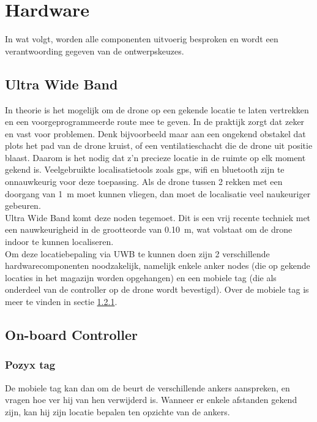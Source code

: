 \chapter{Hardware}
In wat volgt, worden alle componenten uitvoerig besproken en wordt een verantwoording gegeven van de ontwerpskeuzes.

\section{Ultra Wide Band}  \label{sec:uwb}
In theorie is het mogelijk om de drone op een gekende locatie te laten vertrekken en een voorgeprogrammeerde route mee te geven. In de praktijk zorgt dat zeker en vast voor problemen. Denk bijvoorbeeld maar aan een ongekend obstakel dat plots het pad van de drone kruist, of een ventilatieschacht die de drone uit positie blaast. Daarom is het nodig dat z'n precieze locatie in de ruimte op elk moment gekend is. Veelgebruikte localisatietools zoals gps, wifi en bluetooth zijn te onnauwkeurig voor deze toepassing. Als de drone tussen 2 rekken met een doorgang van \SI{1}{\m} moet kunnen vliegen, dan moet de localisatie veel naukeuriger gebeuren.\\

Ultra Wide Band komt deze noden tegemoet. Dit is een vrij recente techniek met een nauwkeurigheid in de grootteorde van \SI{0.10}{\m}, wat volstaat om de drone indoor te kunnen localiseren.\\

Om deze locatiebepaling via UWB te kunnen doen zijn 2 verschillende hardwarecomponenten noodzakelijk, namelijk enkele anker nodes (die op gekende locaties in het magazijn worden opgehangen) en een mobiele tag (die als onderdeel van de controller op de drone wordt bevestigd). Over de mobiele tag is meer te vinden in sectie \ref{sec:pozyx_tag}.

\section{On-board Controller} \label{sec:onboard_controller}
\subsection{Pozyx tag}  \label{sec:pozyx_tag}
De mobiele tag kan dan om de beurt de verschillende ankers aanspreken, en vragen hoe ver hij van hen verwijderd is. Wanneer er enkele afstanden gekend zijn, kan hij zijn locatie bepalen ten opzichte van de ankers.\\

